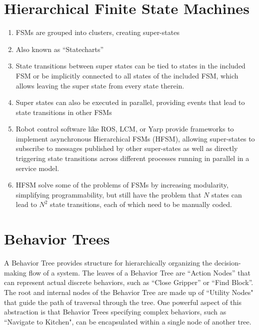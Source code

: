 \section{Hierarchical Finite State Machines}\label{sec:stateflow}
\begin{enumerate}
\item FSMs are grouped into clusters, creating super-states
\item Also known as ``Statecharts'' \cite{harel1987statecharts}

\item State transitions between super states can be tied to states in the included FSM or be implicitly connected to all states of the included FSM, which allows leaving the super state from every state therein.
\item Super states can also be executed in parallel, providing events that lead to state transitions in other FSMs
\item Robot control software like ROS, LCM, or Yarp provide frameworks to implement asynchronous Hierarchical FSMs (HFSM), allowing super-states to subscribe to messages published by other super-states as well as directly triggering state transitions across different processes running in parallel in a service model.
\item HFSM solve some of the problems of FSMs by increasing modularity, simplifying programmability, but still have the problem that $N$ states can lead to $N^2$ state transitions, each of which need to be manually coded.
\end{enumerate}

\section{Behavior Trees}\label{sec:behaviortrees}
A Behavior Tree provides structure for hierarchically organizing the decision-making flow of a system. The leaves of a Behavior Tree are ``Action Nodes'' that can represent actual discrete behaviors, such as ``Close Gripper'' or ``Find Block''. The root and internal nodes of the Behavior Tree are made up of ``Utility Nodes" that guide the path of traversal through the tree. One powerful aspect of this abstraction is that Behavior Trees specifying complex behaviors, such as ``Navigate to Kitchen", can be encapsulated within a single node of another tree.

